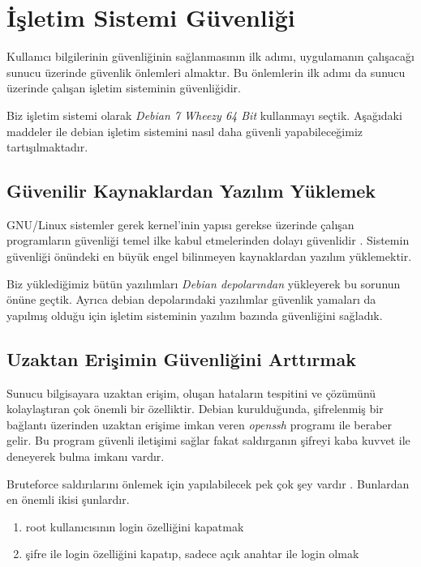 \documentclass[11pt]{report}
\begin{document}
\section{İşletim Sistemi Güvenliği}

Kullanıcı bilgilerinin güvenliğinin sağlanmasının ilk adımı, uygulamanın çalışacağı sunucu üzerinde güvenlik önlemleri almaktır. Bu önlemlerin ilk adımı da sunucu üzerinde çalışan işletim sisteminin güvenliğidir.

Biz işletim sistemi olarak \emph{Debian 7 Wheezy 64 Bit} kullanmayı seçtik. Aşağıdaki maddeler ile debian işletim sistemini nasıl daha güvenli yapabileceğimiz tartışılmaktadır.

\subsection{Güvenilir Kaynaklardan Yazılım Yüklemek}

GNU/Linux sistemler gerek kernel'inin yapısı gerekse üzerinde çalışan programların güvenliği temel ilke kabul etmelerinden dolayı güvenlidir \cite{linuxsec}. Sistemin güvenliği önündeki en büyük engel bilinmeyen kaynaklardan yazılım yüklemektir.

Biz yüklediğimiz bütün yazılımları \emph{Debian depolarından} yükleyerek bu sorunun önüne geçtik. Ayrıca debian depolarındaki yazılımlar güvenlik yamaları da yapılmış olduğu için işletim sisteminin yazılım bazında güvenliğini sağladık.

\subsection{Uzaktan Erişimin Güvenliğini Arttırmak}

Sunucu bilgisayara uzaktan erişim, oluşan hataların tespitini ve çözümünü kolaylaştıran çok önemli bir özelliktir. Debian kurulduğunda, şifrelenmiş bir bağlantı üzerinden uzaktan erişime imkan veren \emph{openssh} programı ile beraber gelir. Bu program güvenli iletişimi sağlar fakat saldırganın şifreyi kaba kuvvet ile deneyerek bulma imkanı vardır.

Bruteforce saldırılarını önlemek için yapılabilecek pek çok şey vardır \cite{blog}. Bunlardan en önemli ikisi şunlardır.

\begin{enumerate}
\item root kullanıcısının login özelliğini kapatmak
\item şifre ile login özelliğini kapatıp, sadece açık anahtar ile login olmak
\end{enumerate}
\end{document}
